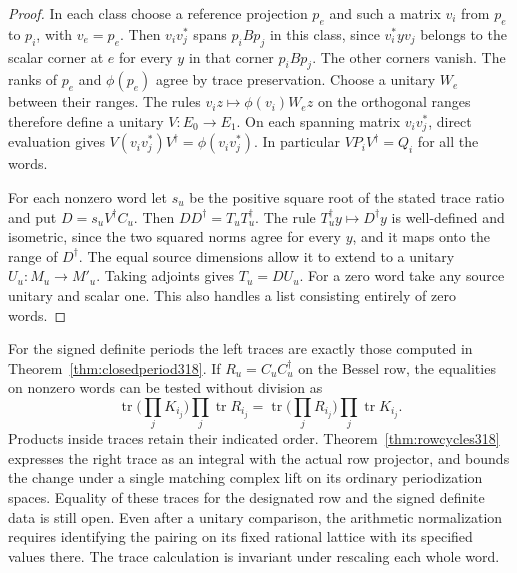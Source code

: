 \documentclass[a4paper,11pt]{article}
\theoremstyle{definition}
\theoremstyle{remark}
\numberwithin{equation}{section}
\begin{document}
\begin{proof}
In each class choose a reference projection \(p_e\) and
such a matrix \(v_i\) from \(p_e\) to \(p_i\), with
\(v_e=p_e\). Then \(v_i v_j^*\) spans \(p_i B p_j\)
in this class, since \(v_i^* yv_j\) belongs to the scalar
corner at \(e\) for every \(y\) in that corner \(p_iBp_j\).
The other corners vanish. The ranks of \(p_e\) and
\(\phi(p_e)\) agree by trace preservation. Choose a unitary
\(W_e\) between their ranges. The rules
\(v_i z\mapsto\phi(v_i)W_e z\) on the orthogonal ranges
therefore define a unitary \(V:E_0\to E_1\). On each
spanning matrix \(v_i v_j^*\), direct evaluation gives
\(V(v_i v_j^*)V^\dagger=\phi(v_i v_j^*)\). In particular
\(VP_iV^\dagger=Q_i\) for all the words.

For each nonzero word let \(s_u\) be the positive square
root of the stated trace ratio and put
\(D=s_u V^\dagger C_u\). Then \(DD^\dagger=T_uT_u^\dagger\).
The rule \(T_u^\dagger y\mapsto D^\dagger y\) is well-defined
and isometric, since the two squared norms agree for every
\(y\), and it maps onto the range of \(D^\dagger\).
The equal source dimensions allow it to extend to a unitary
\(U_u:M_u\to M'_u\). Taking adjoints gives \(T_u=D U_u\).
For a zero word take any source unitary and scalar one.
This also handles a list consisting entirely of zero words.
\end{proof}

For the signed definite periods the left traces are exactly
those computed in Theorem~\ref{thm:closedperiod318}. If
\(R_u=C_uC_u^\dagger\) on the Bessel row, the equalities
on nonzero words can be tested without division as
\[
 \operatorname{tr}\Big(\prod_j K_{i_j}\Big)
                  \prod_j\operatorname{tr}R_{i_j}
    =\operatorname{tr}\Big(\prod_j R_{i_j}\Big)
                  \prod_j\operatorname{tr}K_{i_j}.
\]
Products inside traces retain their indicated order.
Theorem~\ref{thm:rowcycles318} expresses the right trace
as an integral with the actual row projector, and bounds
the change under a single matching complex lift on its
ordinary periodization spaces. Equality of these traces
for the designated row and the signed definite data is
still open. Even after a unitary comparison, the arithmetic
normalization requires identifying the pairing on its fixed
rational lattice with its specified values there. The trace
calculation is invariant under rescaling each whole word.
\end{document}
